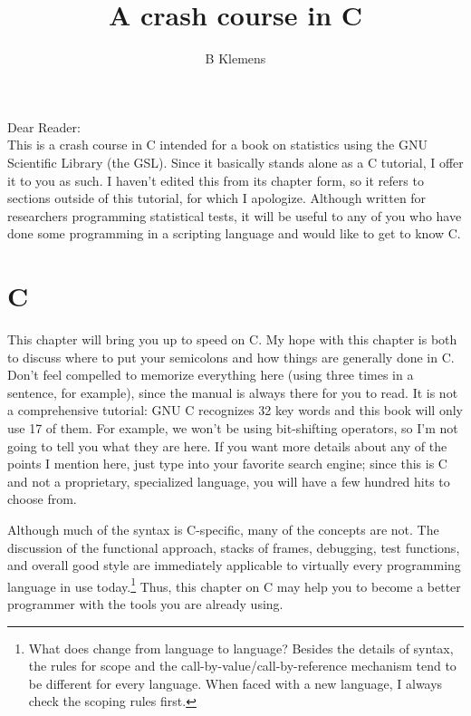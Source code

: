 \documentclass[12pt]{article}
\begin{document}
	\title{A crash course in C}
	\author{B Klemens}
	\maketitle


Dear Reader:\\
This is a crash course in C intended for a book on statistics using the
GNU Scientific Library (the GSL).  Since it basically stands alone as a
C tutorial, I offer it to you as such. I haven't edited this from
its chapter form, so it refers to sections outside of this tutorial,
for which I apologize. Although written for researchers programming
statistical tests, it will be useful to any of you who have done some
programming in a scripting language and would like to get to know C.

\vskip 1cm

\section{C}
\fi



This chapter will bring you up to speed on C.  
My hope with this chapter is both to discuss where to put your semicolons
and how things are generally done in C. Don't feel compelled to memorize
everything here (using  three times in a sentence, for
example), since the manual is always there for you to read.  It is not
a comprehensive tutorial: GNU C recognizes 32 key words and this book
will only use 17 of them. For example, we won't be using bit-shifting
operators, so I'm not going to tell you what they are here.  If you want
more details about any of the points I mention here, just type  into your favorite search engine; since this is C and not a
proprietary, specialized language, you will have a few hundred hits to
choose from. 

Although much of the syntax is C-specific, many of the concepts are not.
The discussion of the functional approach, stacks of frames, debugging,
test functions, and overall good style are immediately applicable to
virtually every programming language in use today.\footnote{What does
change from language to language?  Besides the details of syntax, the
rules for scope and the call-by-value/call-by-reference mechanism tend
to be different for every language. When faced with a new language, I
always check the scoping rules first.} Thus, this chapter on C may help
you to become a better programmer with the tools you are already using.
\end{document}
